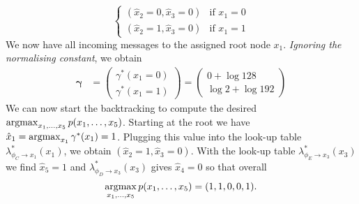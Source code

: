 \begin{exenumerate}
\begin{solution}
\begin{equation}
\begin{cases}
        (\hat{x}_2=0, \hat{x}_3=0) & \text{if } x_1=0\\
        (\hat{x}_2=1, \hat{x}_3=0) & \text{if } x_1=1
      \end{cases}
    \end{equation}
    We now have all incoming messages to the assigned root node $x_1$. \emph{Ignoring the normalising constant}, we obtain
    \begin{align}
      \boldsymbol{\gamma}&=\begin{pmatrix}
      \gamma^*(x_1=0) \\
      \gamma^*(x_1=1)
      \end{pmatrix}
      = \begin{pmatrix}
        0 + \log 128 \\
        \log 2 + \log 192 
      \end{pmatrix}
    \end{align}
    We can now start the backtracking to compute the desired
    $\operatorname*{\mathrm{argmax}}_{x_1, \ldots, x_5} p(x_1, \ldots, x_5)$. Starting at the
    root we have $\hat{x}_1 = \operatorname*{\mathrm{argmax}}_{x_1} \gamma^*(x_1) =
    1$. Plugging this value into the look-up table $\lambda^*_{\phi_C
      \to x_1}(x_1)$, we obtain $(\hat{x}_2=1, \hat{x}_3=0)$. With the
    look-up table $\lambda^*_{\phi_E \to x_3}(x_3)$ we find
    $\hat{x}_5=1$ and $\lambda^*_{\phi_D \to x_3}(x_3)$ gives
    $\hat{x}_4=0$ so that overall
    \begin{equation}
      \operatorname*{\mathrm{argmax}}_{x_1, \ldots, x_5} p(x_1, \ldots, x_5) = (1, 1, 0, 0, 1).
    \end{equation}

    
    \end{solution}
    

\end{exenumerate}
